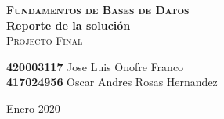 \documentclass[12pt, fleqn]{report}                             %
\author{Jose Luis Onofre Franco y Oscar Andres Rosas Hernandez} %
\theoremstyle{break}                                            %
\begin{document}
\begin{titlepage}
    
    \pagecolor{TitlePageColor}                                      %
    \color{white}                                                   %

    \vspace                                                         %
    \baselineskip                                                   %

    \makebox[0pt][l]{\rule{1.3\textwidth}{2pt}}                     %

    \textbf{\textsc{\Huge Fundamentos de Bases de Datos}}\\[3cm]    %

    {\fontsize{40}{45}\selectfont \textbf{Reporte de la solución}}\\[0.5cm] %
    \textcolor{ColorSubtext}{\textsc{\Huge Projecto Final}}         %
    
    \vfill                                                          %
    
    {\LARGE \textsf{\textbf{420003117} Jose Luis Onofre Franco}} \\[0.5cm] %
    {\LARGE \textsf{\textbf{417024956} Oscar Andres Rosas Hernandez}}      %

    \vspace                                                         %
    \baselineskip                                                   %
    
    {\large \textsf{Enero 2020}}                                    %

\end{titlepage}


\restoregeometry                                                    %
\nopagecolor                                                        %
\end{document}
